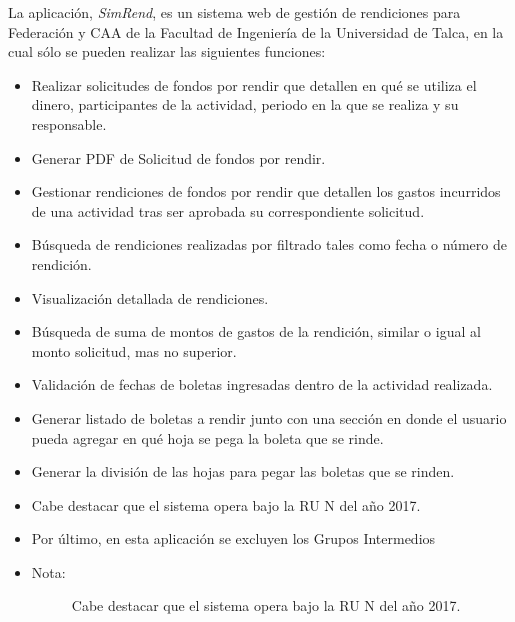 La aplicación, \emph{SimRend}, es un sistema web de gestión de rendiciones para Federación y CAA de la Facultad de Ingeniería de la Universidad de Talca, en la cual sólo se pueden realizar las siguientes funciones:

\begin{itemize}
    \item Realizar solicitudes de fondos por rendir que detallen en qué se utiliza el dinero, participantes de la actividad, periodo en la que se realiza y su responsable.
    
    \item Generar PDF de Solicitud de fondos por rendir.

    \item Gestionar rendiciones de fondos por rendir que detallen los gastos incurridos de una actividad tras ser aprobada su correspondiente solicitud.
    
    \item Búsqueda de rendiciones realizadas por filtrado tales como fecha o número de rendición.
    
    \item Visualización detallada de rendiciones.
    
    \item Búsqueda de suma de montos de gastos de la rendición, similar o igual al monto solicitud, mas no superior.
    
    \item Validación de fechas de boletas ingresadas dentro de la actividad realizada.
    
    \item Generar listado de boletas a rendir junto con una sección en donde el usuario pueda agregar en qué hoja se pega la boleta que se rinde.
    
    \item Generar la división de las hojas para pegar las boletas que se rinden.
    
    \item  Cabe destacar que el sistema opera bajo la RU N del año 2017.
    
    \item Por último, en esta aplicación se excluyen los Grupos Intermedios
\end{itemize}

\begin{itemize}
    \item   \begin{description}
                \item[Nota:] Cabe destacar que el sistema opera bajo la RU N del año 2017.
            \end{description}
\end{itemize}